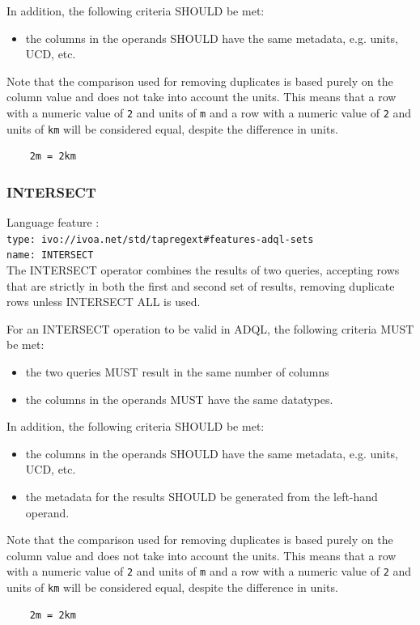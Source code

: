 \documentclass[11pt,a4paper]{ivoa}
\begin{document}
In addition, the following criteria SHOULD be met: 
\begin{itemize}
    \item the columns in the operands SHOULD have the same metadata, e.g. units, UCD, etc.
\end{itemize}

Note that the comparison used for removing duplicates is based purely on the
column value and does not take into account the units.
This means that a row with a numeric value of \verb:2: and units of \verb:m:
and a row with a numeric value of \verb:2: and units of \verb:km: will be
considered equal, despite the difference in units.
\begin{verbatim}
    2m = 2km
\end{verbatim}

\subsubsection{INTERSECT}
{\footnotesize Language feature :}\\
{\footnotesize \verb|type: ivo://ivoa.net/std/tapregext#features-adql-sets|}\\
{\footnotesize \verb|name: INTERSECT|}\\

The INTERSECT operator combines the results of two queries, accepting rows
that are strictly in both the first and second set of results,
removing duplicate rows unless INTERSECT ALL is used.

For an INTERSECT operation to be valid in ADQL, the following criteria MUST be met:

\begin{itemize}
    \item the two queries MUST result in the same number of columns
    \item the columns in the operands MUST have the same datatypes.
\end{itemize}

In addition, the following criteria SHOULD be met: 
\begin{itemize}
    \item the columns in the operands SHOULD have the same metadata, e.g. units, UCD, etc.
    \item the metadata for the results SHOULD be generated from the left-hand operand.
\end{itemize}

Note that the comparison used for removing duplicates is based purely on the
column value and does not take into account the units.
This means that a row with a numeric value of \verb:2: and units of \verb:m:
and a row with a numeric value of \verb:2: and units of \verb:km: will be
considered equal, despite the difference in units.
\begin{verbatim}
    2m = 2km
\end{verbatim}
\end{document}
